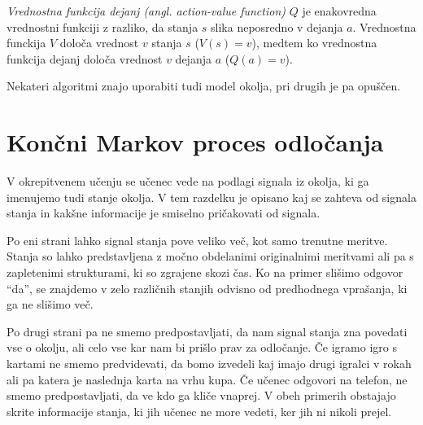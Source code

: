 \documentclass[a4paper, oneside, 12pt]{report}
\begin{document}
{\em Vrednostna funkcija dejanj (angl. action-value function)} $Q$ je enakovredna vrednostni funkciji z razliko, da stanja $s$ slika neposredno v dejanja $a$. Vrednostna funckija $V$ določa vrednost $v$ stanja $s$ ($V(s) = v$), medtem ko vrednostna funkcija dejanj določa vrednost $v$ dejanja $a$ ($Q(a) = v$).

Nekateri algoritmi znajo uporabiti tudi model okolja, pri drugih je pa opuščen.

\section{Končni Markov proces odločanja}
V okrepitvenem učenju se učenec vede na podlagi signala iz okolja, ki ga imenujemo tudi stanje okolja. V tem razdelku je opisano kaj se zahteva od signala stanja in kakšne informacije je smiselno pričakovati od signala.

Po eni strani lahko signal stanja pove veliko več, kot samo trenutne meritve. Stanja so lahko predstavljena z močno obdelanimi originalnimi meritvami ali pa s zapletenimi strukturami, ki so zgrajene skozi čas. Ko na primer slišimo odgovor ``da'', se znajdemo v zelo različnih stanjih odvisno od predhodnega vprašanja, ki ga ne slišimo več.

Po drugi strani pa ne smemo predpostavljati, da nam signal stanja zna povedati vse o okolju, ali celo vse kar nam bi prišlo prav za odločanje. Če igramo igro s kartami ne smemo predvidevati, da bomo izvedeli kaj imajo drugi igralci v rokah ali pa katera je naslednja karta na vrhu kupa. Če učenec odgovori na telefon, ne smemo predpostavljati, da ve kdo ga kliče vnaprej. V obeh primerih obstajajo skrite informacije stanja, ki jih učenec ne more vedeti, ker jih ni nikoli prejel.
\end{document}

